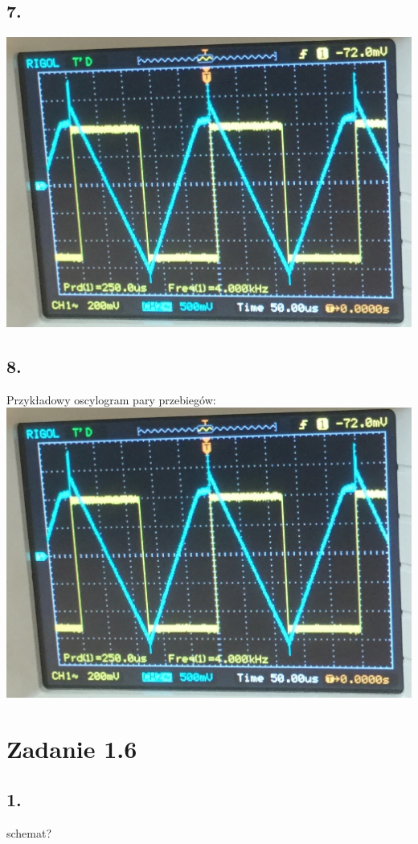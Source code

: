 \documentclass[polish,a4paper]{article}
\begin{document}
\subsection*{7.}
\includegraphics[scale=0.5]{czestotliwosc2}
\subsection*{8.}
Przykładowy oscylogram pary przebiegów:
\includegraphics[scale=0.5]{czestotliwosc2}

\section{Zadanie 1.6}

\subsection*{1.}
schemat?
\end{document}
